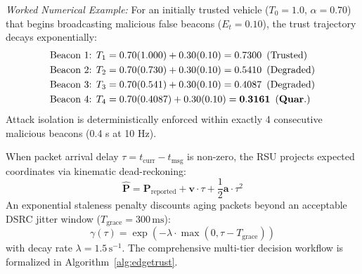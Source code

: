 \documentclass[conference]{IEEEtran}
\begin{document}
\textit{Worked Numerical Example:} For an initially trusted vehicle ($T_0 = 1.0$, $\alpha = 0.70$) that begins broadcasting malicious false beacons ($E_t = 0.10$), the trust trajectory decays exponentially:
\begin{align*}
\text{Beacon 1: } & T_1 = 0.70(1.000) + 0.30(0.10) = 0.7300 \enskip (\text{Trusted}) \\
\text{Beacon 2: } & T_2 = 0.70(0.730) + 0.30(0.10) = 0.5410 \enskip (\text{Degraded}) \\
\text{Beacon 3: } & T_3 = 0.70(0.541) + 0.30(0.10) = 0.4087 \enskip (\text{Degraded}) \\
\text{Beacon 4: } & T_4 = 0.70(0.4087) + 0.30(0.10) = \mathbf{0.3161} \enskip (\mathbf{Quar.})
\end{align*}
Attack isolation is deterministically enforced within exactly 4 consecutive malicious beacons (0.4 s at 10 Hz).

When packet arrival delay $\tau = t_{\text{curr}} - t_{\text{msg}}$ is non-zero, the RSU projects expected coordinates via kinematic dead-reckoning:
\begin{equation}
\hat{\mathbf{P}} = \mathbf{P}_{\text{reported}} + \mathbf{v} \cdot \tau + \frac{1}{2}\mathbf{a}\cdot \tau^2
\label{eq:dead_reckoning}
\end{equation}
An exponential staleness penalty discounts aging packets beyond an acceptable DSRC jitter window ($T_{\text{grace}} = 300\,\text{ms}$):
\begin{equation}
\gamma(\tau) = \exp\left(-\lambda \cdot \max(0, \tau - T_{\text{grace}})\right)
\label{eq:staleness}
\end{equation}
with decay rate $\lambda = 1.5\,\text{s}^{-1}$. The comprehensive multi-tier decision workflow is formalized in Algorithm~\ref{alg:edgetrust}.
\end{document}
